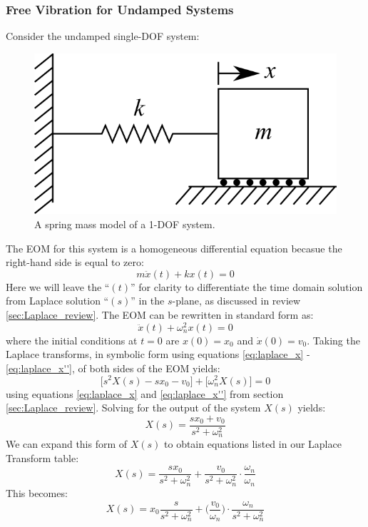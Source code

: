 \documentclass[12pt,letter]{article}
\numberwithin{ex}{section} %
\numberwithin{re}{section} %
\numberwithin{equation}{section}	%
\begin{document}
			\subsubsection{Free Vibration for Undamped Systems}
			Consider the undamped single-DOF system:
			\begin{figure}[H]
				\centering
				\includegraphics[]{../figures/1-DOF-spring_mass_horizontal.png}
				\caption{A spring mass model of a 1-DOF system.}
			\end{figure}
			\noindent The EOM for this system is a homogeneous differential equation becasue the right-hand side is equal to zero:
			\begin{equation}
				m\ddot{x}(t) + kx(t) = 0 
			\end{equation}
			Here we will leave the ``$(t)$'' for clarity to differentiate the time domain solution from Laplace solution ``$(s)$'' in the $s$-plane, as discussed in review \ref{sec:Laplace_review}. The EOM can be rewritten in standard form as:
			\begin{equation}
				\ddot{x}(t) + \omega_n^2x(t) = 0 
			\end{equation}
			where the initial conditions at $t=0$ are $x(0)=x_0$ and $\dot{x}(0) = v_0$. Taking the Laplace transforms, in symbolic form using equations \ref{eq:laplace_x} - \ref{eq:laplace_x''}, of both sides of the EOM yields:
			\begin{equation}
				\big[s^2X(s) -sx_0 -v_0 \big] + \big[ \omega_n^2X(s) \big] =0
			\end{equation}
			using equations \ref{eq:laplace_x} and \ref{eq:laplace_x''} from section \ref{sec:Laplace_review}. Solving for the output of the system $X(s)$ yields:
			\begin{equation}
			X(s) = \frac{sx_0 + v_0}{s^2 + \omega_n^2}
			\end{equation}
			We can expand this form of $X(s)$ to obtain equations listed in our Laplace Transform table:
			\begin{equation}
			X(s) = \frac{sx_0}{s^2 + \omega_n^2} + \frac{v_0}{s^2 + \omega_n^2}\cdot \frac{\omega_n}{\omega_n}
			\end{equation}
			This becomes:
			\begin{equation}
			X(s) = x_0\frac{s}{s^2 + \omega_n^2} + \bigg(\frac{v_0}{\omega_n}\bigg) \cdot \frac{\omega_n}{s^2 + \omega_n^2}
			\end{equation}
			
\end{document}
